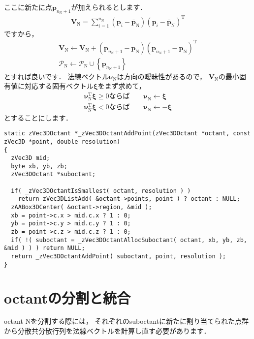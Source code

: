 ﻿\documentclass[a4paper]{jsarticle}
\begin{document}
ここに新たに点$\bm{p}_{n_{\mathrm{N}}+1}$が加えられるとします．
\begin{align*}
\bm{V}_{\mathrm{N}}=\sum_{i=1}^{n_{\mathrm{N}}}(\bm{p}_{i}-\bar{\bm{p}}_{\mathrm{N}})(\bm{p}_{i}-\bar{\bm{p}}_{\mathrm{N}})^{\mathrm{T}}
\end{align*}
ですから，
\begin{align*}
\bm{V}_{\mathrm{N}}\leftarrow\bm{V}_{\mathrm{N}}+(\bm{p}_{n_{\mathrm{N}}+1}-\bar{\bm{p}}_{\mathrm{N}})(\bm{p}_{n_{\mathrm{N}}+1}-\bar{\bm{p}}_{\mathrm{N}})^{\mathrm{T}}
\\
\mathcal{P}_{\mathrm{N}}\leftarrow\mathcal{P}_{\mathrm{N}}\cup\left\{\bm{p}_{n_\mathrm{N}+1}\right\}
\end{align*}
とすれば良いです．
法線ベクトル$\bm{\nu}_{\mathrm{N}}$は方向の曖昧性があるので，
$\bm{V}_{\mathrm{N}}$の最小固有値に対応する固有ベクトル$\bm{\xi}$をまず求めて，
\begin{align*}
\mbox{$\bm{\nu}_{\mathrm{N}}^{\mathrm{T}}\bm{\xi}\geq 0$ならば}\qquad\bm{\nu}_{\mathrm{N}}\leftarrow\bm{\xi}
\\
\mbox{$\bm{\nu}_{\mathrm{N}}^{\mathrm{T}}\bm{\xi}< 0$ならば}\qquad\bm{\nu}_{\mathrm{N}}\leftarrow-\bm{\xi}
\end{align*}
とすることにします．



\begin{screen}
\begin{verbatim}
static zVec3DOctant *_zVec3DOctantAddPoint(zVec3DOctant *octant, const zVec3D *point, double resolution)
{
  zVec3D mid;
  byte xb, yb, zb;
  zVec3DOctant *suboctant;

  if( _zVec3DOctantIsSmallest( octant, resolution ) )
    return zVec3DListAdd( &octant->points, point ) ? octant : NULL;
  zAABox3DCenter( &octant->region, &mid );
  xb = point->c.x > mid.c.x ? 1 : 0;
  yb = point->c.y > mid.c.y ? 1 : 0;
  zb = point->c.z > mid.c.z ? 1 : 0;
  if( !( suboctant = _zVec3DOctantAllocSuboctant( octant, xb, yb, zb, &mid ) ) ) return NULL;
  return _zVec3DOctantAddPoint( suboctant, point, resolution );
}
\end{verbatim}
\end{screen}



\section{octantの分割と統合}


octant Nを分割する際には，
それぞれのsuboctantに新たに割り当てられた点群から分散共分散行列を法線ベクトルを計算し直す必要があります．
\end{document}

